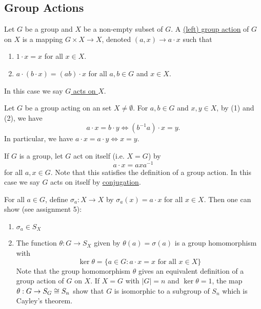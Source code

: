 \documentclass[11pt]{article}
\begin{document}
\subsection{Group Actions}

\begin{definition}
    Let $G$ be a group and $X$ be a non-empty subset of $G$. A \ul{(left) group action} of $G$ on $X$ is a mapping $G\times X\to X$, denoted $(a,x)\to a\cdot x$ such that
    \begin{enumerate}
        \item $1\cdot x=x$ for all $x\in X$.
        \item $a\cdot(b\cdot x)=(ab)\cdot x$ for all $a,b\in G$ and $x\in X$.
    \end{enumerate}
    In this case we say \ul{$G$ acts on $X$}.
\end{definition}

\begin{note}
    Let $G$ be a group acting on an set $X\neq\emptyset$. For $a,b\in G$ and $x,y\in X$, by (1) and (2), we have
    \[a\cdot x=b\cdot y\iff(b^{-1}a)\cdot x=y.\]
    In particular, we have $a\cdot x=a\cdot y\iff x=y$.
\end{note}

\begin{example}
    If $G$ is a group, let $G$ act on itself (i.e. $X=G$) by
    \[a\cdot x=axa^{-1}\]
    for all $a,x\in G$. Note that this satisfies the definition of a group action. In this case we say $G$ acts on itself by \ul{conjugation}.
\end{example}

\begin{remark}
    For all $a\in G$, define $\sigma_a:X\to X$ by $\sigma_a(x)=a\cdot x$ for all $x\in X$. Then one can show (see assignment 5):
    \begin{enumerate}
        \item $\sigma_a\in S_X$
        \item The function $\theta:G\to S_X$ given by $\theta(a)=\sigma(a)$ is a group homomorphism with
        \[\ker\theta=\{a\in G:a\cdot x=x\text{ for all }x\in X\}\]
        Note that the group homomorphism $\theta$ gives an equivalent definition of a group action of $G$ on $X$. If $X=G$ with $|G|=n$ and $\ker\theta=1$, the map $\theta:G\to S_G\cong S_n$ show that $G$ is isomorphic to a subgroup of $S_n$ which is Cayley's theorem.
    \end{enumerate}
\end{remark}
\end{document}

